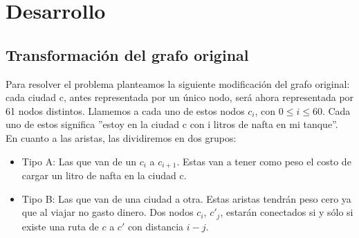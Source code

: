 \section{Desarrollo}

\subsection{Transformación del grafo original}
Para resolver el problema planteamos la siguiente modificación del grafo original: cada ciudad c, antes representada por un único nodo, será ahora representada por 61 nodos distintos. Llamemos a cada uno de estos nodos $c_{i}$, con $0\leq i \leq 60$. Cada uno de estos significa ''estoy en la ciudad c con i litros de nafta en mi tanque''. \\
\indent En cuanto a las aristas, las dividiremos en dos grupos:
\begin{itemize}
\item Tipo A:  Las que van de un  $c_{i}$ a  $c_{i+1}$. Estas van a tener como peso el costo de cargar un litro de nafta en la ciudad c.
\item Tipo B: Las que van de una ciudad a otra. Estas aristas tendrán peso cero ya que al viajar no gasto dinero. Dos nodos $c_{i}$, $c'_{j}$, estarán conectados si y sólo si existe una ruta de $c$ a $c'$ con distancia $i-j$.
\end{itemize}

